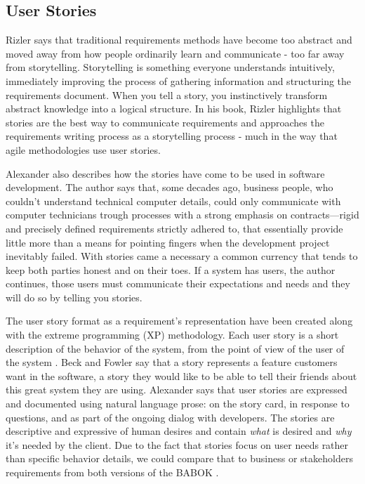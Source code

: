 \subsection{User Stories}

Rizler \cite{Rinzler_2009} says that traditional requirements methods have become too abstract and moved away from how people ordinarily learn and communicate - too far away from storytelling. Storytelling is something everyone understands intuitively, immediately improving the process of gathering information and structuring the requirements document. When you tell a story, you instinctively transform abstract knowledge into a logical structure. In his book, Rizler highlights that stories are the best way to communicate requirements and approaches the requirements writing process as a storytelling process - much in the way that agile methodologies use user stories. 

Alexander \cite{Alexander_2004} also describes how the stories have come to be used in software development. The author says that, some decades ago, business people, who couldn't understand technical computer details, could only communicate with computer technicians trough processes with a strong emphasis on contracts—rigid and precisely defined requirements strictly adhered to, that essentially provide little more than a means for pointing fingers when the development project inevitably failed. With stories came a necessary a common currency that tends to keep both parties honest and on their toes. If a system has users, the author continues, those users must communicate their expectations and needs and they will do so by telling you stories.

The user story format as a requirement's representation have been created along with the extreme programming (XP) methodology. Each user story is a short description of the behavior of the system, from the point of view of the user of the system \cite{Jeffries_2000}. Beck and Fowler \cite{Beck_Fowler_2000} say that a story represents a feature customers want in the software, a story they would like to be able to tell their friends about this great system they are using. Alexander \cite{Alexander_2004} says that user stories are expressed and documented using natural language prose: on the story card, in response to questions, and as part of the ongoing dialog with developers. The stories are descriptive and expressive of human desires and contain \textit{what} is desired and \textit{why} it's needed by the client. Due to the fact that stories focus on user needs rather than specific behavior details, we could compare that to business or stakeholders requirements from both versions of the BABOK \cite{Babok_2009} \cite{Babok_2015}.

